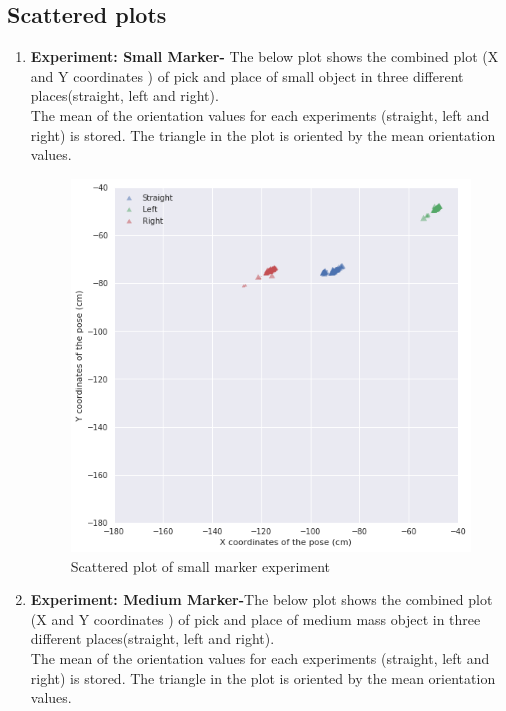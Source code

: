 \documentclass[11pt,a4paper]{article}
\begin{document}
				\subsection{Scattered plots}
				\begin{enumerate}
				\item \textbf{Experiment: Small Marker-} The below plot shows the combined plot (X and Y coordinates ) of pick and place of small object in three different places(straight, left and right). \\ The mean of the orientation values for each experiments (straight, left and right) is stored. The triangle in the plot is oriented by the mean orientation values.
				
				\begin{figure}[H]
					\centering
					\includegraphics[scale=0.7]{small}	
					\caption{Scattered plot of small marker experiment}
				\end{figure}
				\newpage
				\item \textbf{Experiment: Medium Marker-}The below plot shows the combined plot (X and Y coordinates ) of pick and place of medium mass object in three different places(straight, left and right). \\ The mean of the orientation values for each experiments (straight, left and right) is stored. The triangle in the plot is oriented by the mean orientation values.
				\begin{figure}[H]

\end{figure}
\end{enumerate}
\end{document}
